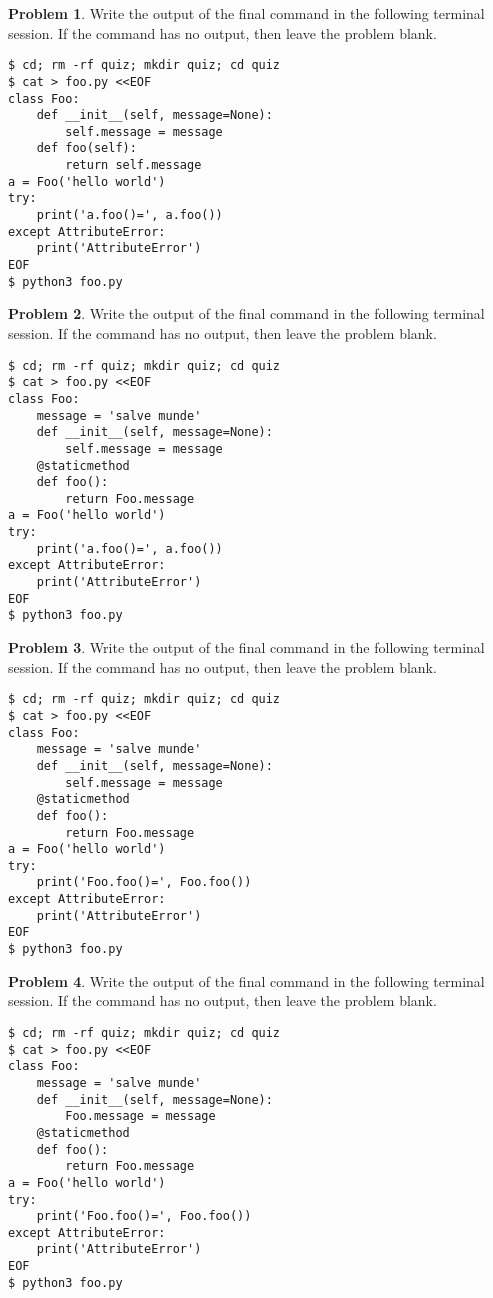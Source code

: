 \documentclass[10pt]{article}
\theoremstyle{definition}
\newtheorem{problem}{Problem}
\begin{document}
\filbreak
\begin{problem}
    Write the output of the final command in the following terminal session.
    If the command has no output, then leave the problem blank.
\end{problem}
\begin{lstlisting}
$ cd; rm -rf quiz; mkdir quiz; cd quiz
$ cat > foo.py <<EOF
class Foo:
    def __init__(self, message=None):
        self.message = message
    def foo(self):
        return self.message
a = Foo('hello world')
try:
    print('a.foo()=', a.foo())
except AttributeError:
    print('AttributeError') 
EOF
$ python3 foo.py
\end{lstlisting}

\filbreak
\begin{problem}
    Write the output of the final command in the following terminal session.
    If the command has no output, then leave the problem blank.
\end{problem}
\begin{lstlisting}
$ cd; rm -rf quiz; mkdir quiz; cd quiz
$ cat > foo.py <<EOF
class Foo:
    message = 'salve munde'
    def __init__(self, message=None):
        self.message = message
    @staticmethod
    def foo():
        return Foo.message
a = Foo('hello world')
try:
    print('a.foo()=', a.foo())
except AttributeError:
    print('AttributeError') 
EOF
$ python3 foo.py
\end{lstlisting}


\filbreak
\begin{problem}
    Write the output of the final command in the following terminal session.
    If the command has no output, then leave the problem blank.
\end{problem}
\begin{lstlisting}
$ cd; rm -rf quiz; mkdir quiz; cd quiz
$ cat > foo.py <<EOF
class Foo:
    message = 'salve munde'
    def __init__(self, message=None):
        self.message = message
    @staticmethod
    def foo():
        return Foo.message
a = Foo('hello world')
try:
    print('Foo.foo()=', Foo.foo())
except AttributeError:
    print('AttributeError') 
EOF
$ python3 foo.py
\end{lstlisting}


\filbreak
\begin{problem}
    Write the output of the final command in the following terminal session.
    If the command has no output, then leave the problem blank.
\end{problem}
\begin{lstlisting}
$ cd; rm -rf quiz; mkdir quiz; cd quiz
$ cat > foo.py <<EOF
class Foo:
    message = 'salve munde'
    def __init__(self, message=None):
        Foo.message = message
    @staticmethod
    def foo():
        return Foo.message
a = Foo('hello world')
try:
    print('Foo.foo()=', Foo.foo())
except AttributeError:
    print('AttributeError') 
EOF
$ python3 foo.py
\end{lstlisting}
\end{document}
